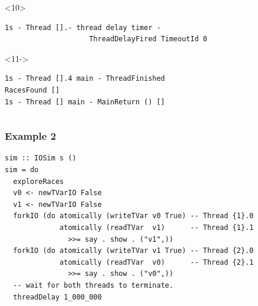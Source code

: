 \documentclass[t,x11names,xcolor={x11names},hyperref={colorlinks,citecolor=Blue4,linkcolor=Blue4,anchorcolor=Blue4,urlcolor=Blue4}]{beamer}
\begin{document}
\begin{frame}[fragile]
\begin{columns}
\begin{column}{0.6\textwidth}
\begin{onlyenv}
\begin{verbatim}
        \end{verbatim}
      \end{onlyenv}
      \begin{onlyenv}<10>
        \begin{verbatim}
1s - Thread [].- thread delay timer -
                    ThreadDelayFired TimeoutId 0
        \end{verbatim}
      \end{onlyenv}
      \begin{onlyenv}<11->
        \begin{verbatim}
1s - Thread [].4 main - ThreadFinished
RacesFound []
1s - Thread [] main - MainReturn () []
        \end{verbatim}
      \end{onlyenv}
    \end{column}
  \end{columns}
\end{frame}

\begin{frame}[fragile]
  \frametitle{Example 2}
  {\small\begin{verbatim}
sim :: IOSim s ()
sim = do
  exploreRaces
  v0 <- newTVarIO False
  v1 <- newTVarIO False
  forkIO (do atomically (writeTVar v0 True) -- Thread {1}.0
             atomically (readTVar  v1)      -- Thread {1}.1
               >>= say . show . ("v1",))
  forkIO (do atomically (writeTVar v1 True) -- Thread {2}.0
             atomically (readTVar  v0)      -- Thread {2}.1
               >>= say . show . ("v0",))
  -- wait for both threads to terminate.
  threadDelay 1_000_000
  \end{verbatim}
  }
\end{frame}
\end{document}
